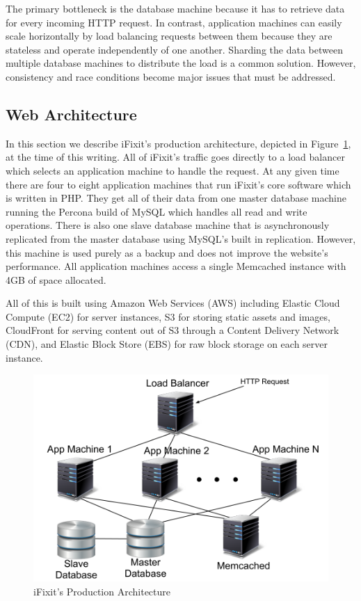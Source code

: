 \documentclass[12pt]{ucthesis}
\begin{document}
The primary bottleneck is the database machine because it has to retrieve data for every incoming HTTP request.
In contrast, application machines can easily scale horizontally by load balancing requests between them because they are stateless and operate independently of one another.
Sharding the data between multiple database machines to distribute the load is a common solution.
However, consistency and race conditions become major issues that must be addressed.

\subsection{Web Architecture}
In this section we describe \textsf{iFixit}'s production architecture, depicted in Figure~\ref{fig:iFixitArchitecture}, at the time of this writing.
All of \textsf{iFixit}'s traffic goes directly to a load balancer which selects an application machine to handle the request.
At any given time there are four to eight application machines that run \textsf{iFixit}'s core software which is written in PHP\@.
They get all of their data from one master database machine running the Percona build of \textsf{MySQL} which handles all read and write operations.
There is also one slave database machine that is asynchronously replicated from the master database using \textsf{MySQL}'s built in replication.
However, this machine is used purely as a backup and does not improve the website's performance.
All application machines access a single \textsf{Memcached} instance with 4GB of space allocated.

All of this is built using Amazon Web Services (AWS) including Elastic Cloud Compute (EC2) for server instances, S3 for storing static assets and images, CloudFront for serving content out of S3 through a Content Delivery Network (CDN), and Elastic Block Store (EBS) for raw block storage on each server instance.

\begin{figure}[h]
\centering
\includegraphics[width=\textwidth]{assets/iFixitArchitecture.png}
\caption{iFixit's Production Architecture}
\label{fig:iFixitArchitecture}
\end{figure}
\end{document}
